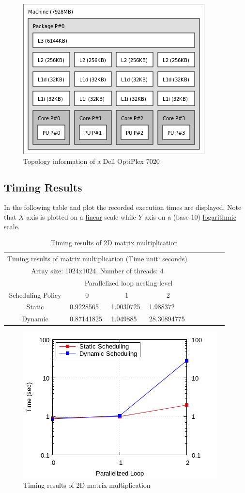\documentclass{article}
\begin{document}
\begin{figure}[htbp]
  \centering
  \includegraphics[width=0.5\columnwidth]{./opti7020-topo.png}
  \caption{Topology information of a Dell OptiPlex 7020}
\end{figure}

\pagebreak

\subsection{Timing Results}
In the following table and plot the recorded execution times are displayed.
Note that $X$ axis is plotted on a \underline{linear} scale while $Y$ axis on
a (base 10) \underline{logarithmic} scale.


\begin{table}[htbp]
  \centering
    \begin{tabular}{|c||l|l|l|l|l|l|l|l|} 
    \hline
    \multicolumn{4}{|c|}{Timing results of matrix multiplication (Time unit: seconds)} \\
    \multicolumn{4}{|c|}{Array size: 1024x1024, Number of threads: 4} \\
    \hline
    & \multicolumn{3}{|c|}{Parallelized loop nesting level} \\
    \hline
    Scheduling Policy  & \multicolumn{1}{|c|}{0} & \multicolumn{1}{|c|}{1} & \multicolumn{1}{|c|}{2} \\
    \hline\hline
    Static & 0.9228565 & 1.0030725 & 1.988372 \\
    \hline
    Dynamic & 0.87141825 & 1.049885 & 28.30894775 \\
    \hline
    \end{tabular}
  \caption{Timing results of 2D matrix multiplication}
\end{table}


\begin{figure}[htbp]
  \centering
  \includegraphics[width=0.55\columnwidth]{../ex1/plots/matmul.png}
  \caption{Timing results of 2D matrix multiplication}
\end{figure}
\end{document}

